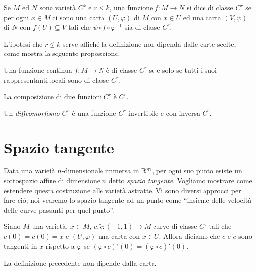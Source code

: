  \begin{definition} 
  Se $M$ ed $N$ sono varietà $C^k$ e $r\le k$, una funzione $f:M\to N$ si dice
  di classe $C^r$ se per ogni $x\in M$ ci sono una carta $(U,\varphi)$ di $M$ con
  $x\in U$ ed una carta $(V,\psi)$ di $N$ con $f(U)\subseteq V$ tali che $\psi\circ f\circ\varphi^{-1}$
  sia di classe $C^r$.
 \end{definition}
 
 L'ipotesi che $r\le k$ serve affiché la definizione non dipenda dalle carte scelte, come
 mostra la seguente proposizione.
 
 \begin{proposition}
  Una funzione continua $f:M\to N$ è di classe $C^r$ se e solo se tutti i suoi rappresentanti locali sono di classe $C^r$.
 \end{proposition}
 
 \begin{proposition}
   La composizione di due funzioni $C^r$ è $C^r$.
 \end{proposition}
 
 \begin{definition} 
  Un \emph{diffeomorfismo $C^r$} è una funzione $C^r$ invertibile e con inversa $C^r$.
 \end{definition}
 
 \section{Spazio tangente}
 
 Data una varietà $n$-dimensionale immersa in $\mathbb R^m$, per ogni suo punto esiste
 un sottospazio affine di dimensione $n$ detto \emph{spazio tangente}. Vogliamo
 mostrare come estendere questa costruzione alle varietà astratte. Vi sono diversi
 approcci per fare ciò; noi vedremo lo spazio tangente ad un punto come ``insieme delle
 velocità delle curve passanti per quel punto''.
 
\begin{definition}
	Siano $M$ una varietà, $x\in M$, $c,\tilde{c}:(-1,1)\to M$ curve di classe $C^1$ tali che $c(0)=\tilde{c}(0)=x$ e $(U,\varphi)$ una carta con $x\in U$. Allora diciamo che $c$ e $\tilde{c}$ sono 	tangenti in $x$ rispetto a $\varphi$ se $(\varphi\circ c)'(0)=(\varphi\circ\tilde{c})'(0)$.
\end{definition}

\begin{proposition}
	La definizione precedente non dipende dalla carta.
\end{proposition}

